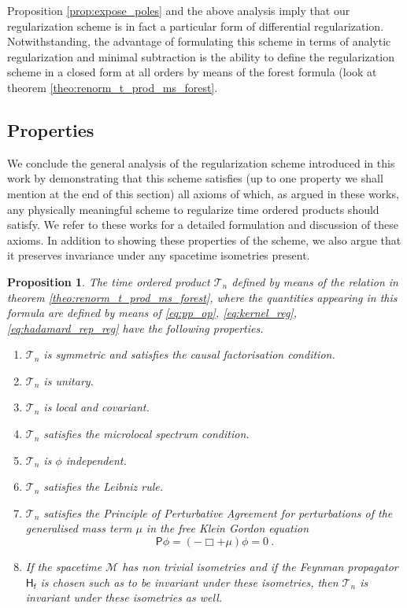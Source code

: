 \documentclass[12pt]{book}
\newcommand{\Mcal}{\mathcal{M}}
\newcommand{\Tcal}{\mathcal{T}}
\newcommand{\Hsf}{\mathsf{H}}
\newcommand{\Psf}{\mathsf{P}}
\newcommand{\fsf}{\mathsf{f}}
\theoremstyle{break}
\newtheorem{proposition}{Proposition}
\begin{document}
\bigskip


Proposition \ref{prop:expose_poles} and the above analysis imply that our regularization scheme is in fact a particular form of differential regularization. Notwithstanding, the advantage of formulating this scheme in terms of analytic regularization and minimal subtraction is the ability to define the regularization scheme in a closed form at all orders by means of the forest formula (look at theorem \ref{theo:renorm_t_prod_ms_forest}.


\subsection{Properties}


We conclude the general analysis of the regularization scheme introduced in this work by demonstrating that this scheme satisfies (up to one property we shall mention at the end of this section) all axioms of \cite{hollands_local_2001,hollands_existence_2002,hollands_conservation_2005} which, as argued in these works, any physically meaningful scheme to regularize time ordered products should satisfy. We refer to these works for a detailed formulation and discussion of these axioms. In addition to showing these properties of the scheme, we also argue that it preserves invariance under any spacetime isometries present.


\begin{proposition}\label{prop:properties_scheme} 
The time ordered product $\Tcal_n$ defined by means of the relation in theorem \ref{theo:renorm_t_prod_ms_forest}, where the quantities appearing in this formula are defined by means of \eqref{eq:pp_op}, \eqref{eq:kernel_reg}, \eqref{eq:hadamard_rep_reg} have the following properties.
%
\begin{enumerate}
%
\item $\Tcal_n$ is symmetric and satisfies the causal factorisation condition.
%
\item $\Tcal_n$ is unitary.
%
\item $\Tcal_n$ is local and covariant.
%
\item $\Tcal_n$ satisfies the microlocal spectrum condition.
%
\item $\Tcal_n$ is $\phi$ independent.
%
\item $\Tcal_n$ satisfies the Leibniz rule.
%
\item $\Tcal_n$ satisfies the Principle of Perturbative Agreement for perturbations of the generalised mass term $\mu$ in the free Klein Gordon equation
%
\begin{equation*}
\Psf \phi = \left( - \Box + \mu \right) \phi = 0 \ . 
\end{equation*}
%
\item If the spacetime $\Mcal$ has non trivial isometries and if the Feynman propagator $\Hsf_\fsf$ is chosen such as to be invariant under these isometries, then $\Tcal_n$ is invariant under these isometries as well.
%
\end{enumerate}
%
\end{proposition}
\end{document}

